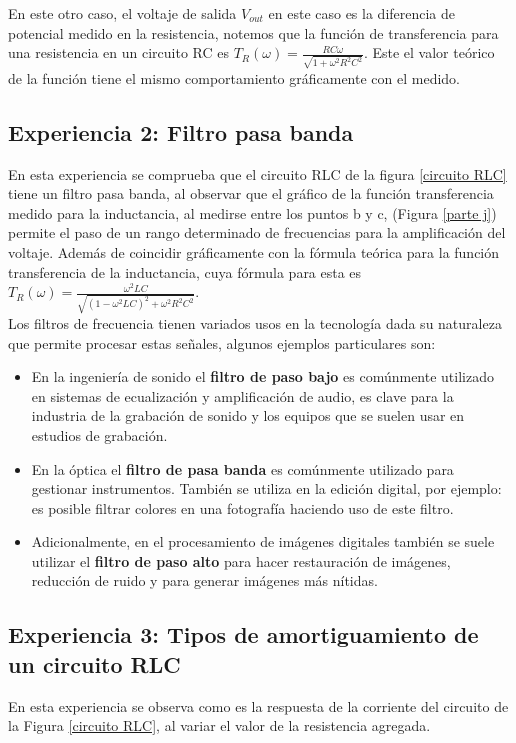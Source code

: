 \documentclass[letterpaper,11pt]{article} %
\begin{document}
 En este otro caso, el voltaje de salida $V_{out}$ en este caso es la diferencia de potencial medido en la resistencia, notemos que la función de transferencia para una resistencia en un circuito RC es $T_R(\omega)=\frac{RC\omega}{\sqrt{1+\omega^2R^2C^2}}$. Este el valor teórico de la función tiene el mismo comportamiento gráficamente con el medido.

\subsection{Experiencia 2: Filtro pasa banda}
En esta experiencia se comprueba que el circuito RLC de la figura \ref{circuito RLC} tiene un filtro pasa banda, al observar que el gráfico de la función transferencia medido para la inductancia, al medirse entre los puntos b y c, (Figura \ref{parte j}) permite el paso de un rango determinado de frecuencias para la amplificación del voltaje. Además de coincidir gráficamente con la fórmula teórica para la función transferencia de la inductancia, cuya fórmula para esta es $T_R(\omega)=\frac{\omega^2LC}{\sqrt{(1-\omega^2LC)^2+\omega^2R^2C^2}}$.\\

Los filtros de frecuencia tienen variados usos en la tecnología dada su naturaleza que permite procesar estas señales, algunos ejemplos particulares son:
\begin{itemize}
    \item[\rightarrow] En la ingeniería de sonido el \textbf{filtro de paso bajo} es comúnmente utilizado en sistemas de ecualización y amplificación de audio, es clave para la industria de la grabación de sonido y los equipos que se suelen usar en estudios de grabación.
    \item[\rightarrow] En la óptica el \textbf{filtro de pasa banda} es comúnmente utilizado para gestionar instrumentos. También se utiliza en la edición digital, por ejemplo: es posible filtrar colores en una fotografía haciendo uso de este filtro.
    \item[\rightarrow] Adicionalmente, en el procesamiento de imágenes digitales también se suele utilizar el \textbf{filtro de paso alto} para hacer restauración de imágenes, reducción de ruido y para generar imágenes más nítidas. 
\end{itemize}



\subsection{Experiencia 3: Tipos de amortiguamiento de un circuito RLC}
En esta experiencia se observa como es la respuesta de la corriente del circuito de la Figura \ref{circuito RLC}, al variar el valor de la resistencia agregada. \\ 
\end{document}
